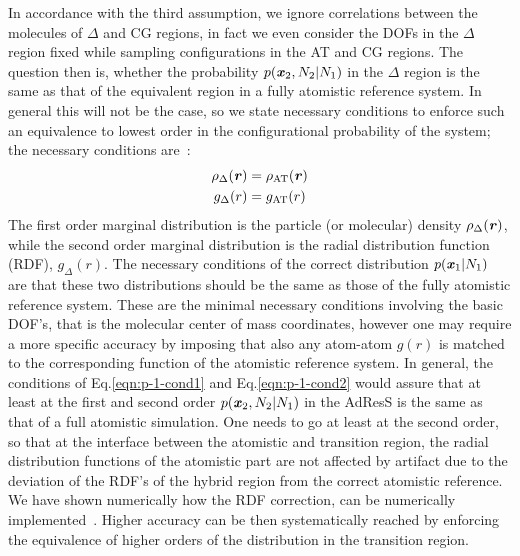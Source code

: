 \documentclass[aip,jcp,a4paper,reprint,onecolumn]{revtex4-1}
\newcommand{\vect}[1]{\textbf{\textit{#1}}}
\newcommand{\AT}{{\textrm{{AT}}}}
\newcommand{\HY}{{\Delta}}
\begin{document}
In accordance with the third assumption, we ignore correlations between the molecules of $\HY$ and CG regions, in fact we even consider the DOFs in the $\HY$ region fixed 
  while sampling configurations in the AT and CG regions. 
The question then is, whether the probability $p(\vect
x_2, N_2 | N_1)$ in the $\HY$ region  is the same as that of the equivalent region in a fully atomistic reference
system. In general this will not be the case, so we 
state necessary conditions to enforce such an equivalence to lowest order in the configurational probability of the system; the necessary conditions are~\cite{rdfcorr}:
\begin{align}\label{eqn:p-1-cond1}
  \rho_{\HY}(\vect r) &= \rho_{\AT}(\vect r)\\\label{eqn:p-1-cond2}
  g_{\HY}( r) &= g_{\AT}(r)
\end{align}
The first order marginal distribution is the particle (or molecular) density 
$\rho_{\HY}(\vect r)$, while the second order marginal distribution is
the radial distribution function (RDF), $g_{\HY}(r)$. 
The necessary
conditions of the correct distribution $p(\vect x_1|N_1)$
are that these two distributions should be the same as those of the fully atomistic reference system. 
These are the minimal necessary conditions involving the basic DOF's, that is the molecular center of mass coordinates, however one may require a more specific accuracy by imposing that also any atom-atom $g(r)$ is matched to the corresponding function of the atomistic reference system. 
In general, the conditions of Eq.\ref{eqn:p-1-cond1} and Eq.\ref{eqn:p-1-cond2} would assure that at least at the first and second order $p(\vect x_2, N_2 | N_1)$ in the AdResS is the same as that of a full atomistic simulation. One needs to go at least at the second order, so that at the interface between the atomistic and transition region, the radial distribution functions of the atomistic part are not affected by artifact due to the deviation of the RDF's of the hybrid region from the correct atomistic reference. 
We have shown numerically how the RDF correction, can be numerically implemented~\cite{rdfcorr}.
Higher accuracy can be then systematically reached by enforcing the equivalence of higher orders of the distribution in the transition region.
\end{document}
